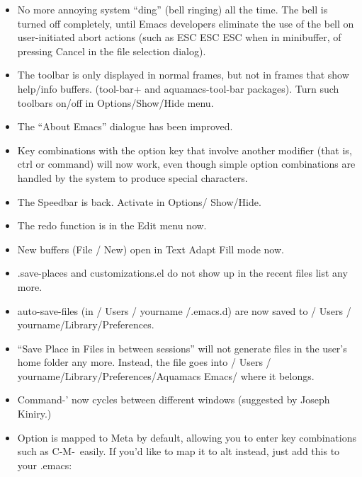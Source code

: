 \begin{itemize}
\item No more annoying system ``ding'' (bell ringing) all the time.  The bell is
    turned off completely, until Emacs developers eliminate the use of
    the bell on user-initiated abort actions (such as ESC ESC ESC when
    in minibuffer, of pressing Cancel in the file selection dialog).

\item The toolbar is only displayed in normal frames, but not
    in frames that show help/info buffers. (tool-bar+ and
    aquamacs-tool-bar packages). Turn such toolbars on/off in
    Options/Show/Hide menu.

\item The ``About Emacs'' dialogue has been improved.

\item Key combinations with the option key that  involve
    another modifier (that is, ctrl or command) will now work, even
    though simple option combinations are handled by the system to
    produce special characters.

\item The Speedbar is back. Activate in Options/ Show/Hide.

\item The redo function is in the Edit menu now.

\item New buffers (File / New) open in Text Adapt Fill mode now.

\item .save-places and customizations.el do not show up in the recent  files list
    any more.

\item auto-save-files (in / Users / yourname /.emacs.d) are now saved to / Users / yourname/Library/Preferences.

\item ``Save Place in Files in between sessions'' will not generate  files in the
    user's home folder any more. Instead, the file goes into
    / Users / yourname/Library/Preferences/Aquamacs Emacs/ where it belongs.

\item Command-' now cycles between different windows (suggested  by Joseph Kiniry.)



\item Option is mapped to Meta by default, allowing you to enter key
    combinations such as C-M-\ easily. If you'd like to map it to
    alt instead, just add this to your .emacs:


\end{itemize}
